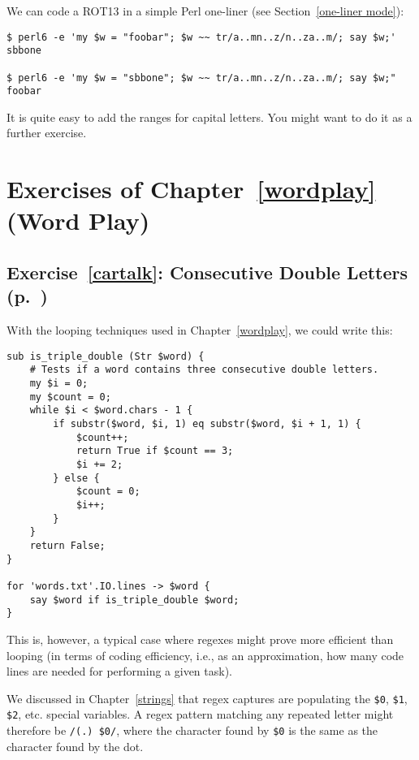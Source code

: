 We can code a ROT13 in a simple Perl one-liner (see Section~\ref{one-liner mode}):
\label{rot13_oneliner}

\begin{verbatim}
$ perl6 -e 'my $w = "foobar"; $w ~~ tr/a..mn..z/n..za..m/; say $w;'
sbbone

$ perl6 -e 'my $w = "sbbone"; $w ~~ tr/a..mn..z/n..za..m/; say $w;"
foobar
\end{verbatim}

It is quite easy to add the ranges for capital letters. You might want to do it as a further exercise.


\section{Exercises of Chapter~\ref{wordplay} (Word Play)}

\subsection{Exercise~\ref{cartalk}: Consecutive Double Letters (p.~\pageref{cartalk})}
\label{sol_cartalk}

With the looping techniques used in Chapter~\ref{wordplay}, 
we could write this:

\begin{verbatim}
sub is_triple_double (Str $word) {
    # Tests if a word contains three consecutive double letters.
    my $i = 0;
    my $count = 0;
    while $i < $word.chars - 1 {
        if substr($word, $i, 1) eq substr($word, $i + 1, 1) {
            $count++;
            return True if $count == 3;
            $i += 2;
        } else {
            $count = 0;
            $i++;
        }
    }
    return False;
}

for 'words.txt'.IO.lines -> $word {
    say $word if is_triple_double $word;
}
\end{verbatim}
%

This is, however, a typical case where regexes might prove 
more efficient than looping  (in terms of coding efficiency, 
i.e., as an approximation, how many code lines are needed 
for performing a given task).

We discussed in Chapter~\ref{strings} that regex captures are 
populating the \verb'$0', \verb'$1', \verb'$2', etc. special 
variables. A regex pattern matching any repeated letter might 
therefore be \verb'/(.) $0/', where the character found 
by \verb'$0' is the same as the character found by the dot.

